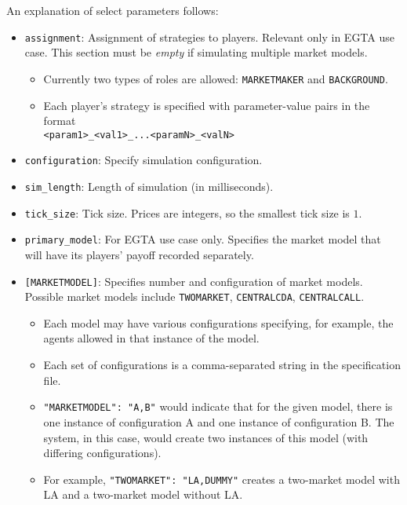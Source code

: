 \documentclass[11pt]{article}
\begin{document}
An explanation of select parameters follows:
\begin{itemize}
\item \verb|assignment|: Assignment of strategies to players. Relevant only in EGTA use case. This section must be \emph{empty} if simulating multiple market models.

\begin{itemize}
\item Currently two types of roles are allowed: \verb|MARKETMAKER| and \verb|BACKGROUND|.
\item Each player's strategy is specified with parameter-value pairs in the format \\
\verb|<param1>_<val1>_...<paramN>_<valN>|
\end{itemize}


\item \verb|configuration|: Specify simulation configuration.

\item \verb|sim_length|: Length of simulation (in milliseconds).
\item \verb|tick_size|: Tick size. Prices are integers, so the smallest tick size is $1$.
\item \verb|primary_model|: For EGTA use case only. Specifies the market model that will have its players' payoff recorded separately.
\item \verb|[MARKETMODEL]|: Specifies number and configuration of market models. Possible market models include \verb|TWOMARKET|, \verb|CENTRALCDA|, \verb|CENTRALCALL|.

\begin{itemize}
\item Each model may have various configurations specifying, for example, the agents allowed in that instance of the model.

\item Each set of configurations is a comma-separated string in the specification file.

\item \verb|"MARKETMODEL": "A,B"| would indicate that for the given model, there is one instance of configuration A and one instance of configuration B. The system, in this case, would create two instances of this model (with differing configurations).

\item For example, \verb|"TWOMARKET": "LA,DUMMY"| creates a two-market model with LA and a two-market model without LA. 
\end{itemize}


\end{itemize}
\end{document}
